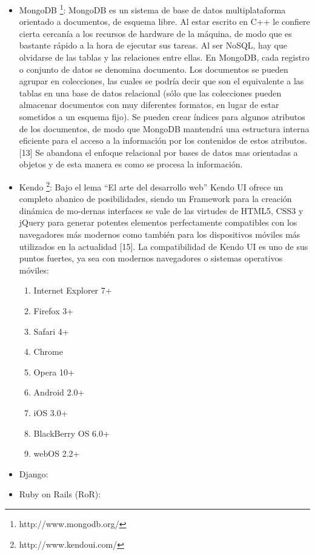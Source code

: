 \begin{itemize}
 \item MongoDB \footnote{http://www.mongodb.org/}: MongoDB es un sistema de base de datos
  multiplataforma orientado a documentos, de esquema libre. Al estar escrito en C++ le confiere cierta 
  cercanía a los recursos de hardware de la máquina, de modo que es bastante rápido a la hora de 
  ejecutar sus tareas. Al ser NoSQL, hay que olvidarse de las tablas y las relaciones entre ellas.
  En MongoDB, cada registro o conjunto de datos se denomina documento. Los documentos se pueden 
  agrupar en colecciones, las cuales se  podría decir que son el equivalente a las tablas en una base 
  de datos relacional (sólo que las colecciones pueden almacenar documentos con muy diferentes formatos, 
  en lugar de estar sometidos a un esquema fijo). Se pueden crear índices para algunos atributos de los 
  documentos, de modo que MongoDB mantendrá una estructura interna eficiente para el acceso a la información 
  por los contenidos de estos atributos. [13] Se abandona el enfoque relacional por bases de datos mas 
  orientadas a objetos y de esta manera es como se procesa la información.
 
 \item Kendo \footnote{http://www.kendoui.com/}: Bajo el lema “El arte del desarrollo web” Kendo UI 
 ofrece un completo abanico de posibilidades, siendo un Framework para la creación dinámica de mo-dernas 
 interfaces se vale de las virtudes de HTML5, CSS3 y jQuery para generar potentes elementos perfectamente 
 compatibles con los navegadores más modernos como también para los dispositivos móviles más utilizados 
 en la actualidad [15]. La compatibilidad de Kendo UI es uno de sus puntos fuertes, ya sea con modernos 
 navegadores o sistemas operativos móviles:
 \begin{enumerate}
  \item Internet Explorer 7+
  \item Firefox 3+
  \item Safari 4+
  \item Chrome
  \item Opera 10+
  \item Android 2.0+
  \item iOS 3.0+
  \item BlackBerry OS 6.0+
  \item webOS 2.2+
 \end{enumerate}
 
\item Django:

\item Ruby on Rails (RoR):
\end{itemize}


